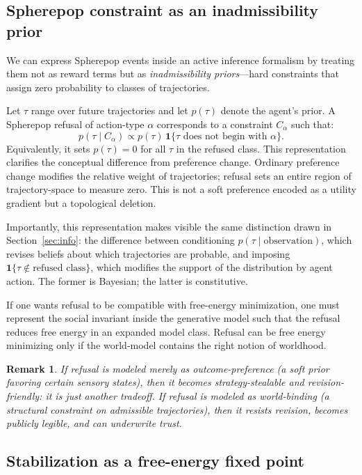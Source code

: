 \documentclass[11pt]{article}
\newtheorem{remark}{Remark}
\begin{document}
\subsection{Spherepop constraint as an inadmissibility prior}

We can express Spherepop events inside an active inference formalism by treating
them not as reward terms but as \emph{inadmissibility priors}---hard constraints
that assign zero probability to classes of trajectories.

Let $\tau$ range over future trajectories and let $p(\tau)$ denote the agent's
prior. A Spherepop refusal of action-type $\alpha$ corresponds to a constraint
$C_\alpha$ such that:
\[
p(\tau \mid C_\alpha) \propto p(\tau)\,\mathbf{1}\{\tau \text{ does not begin with }\alpha\}.
\]
Equivalently, it sets $p(\tau)=0$ for all $\tau$ in the refused class. This
representation clarifies the conceptual difference from preference change.
Ordinary preference change modifies the relative weight of trajectories; refusal
sets an entire region of trajectory-space to measure zero. This is not a soft
preference encoded as a utility gradient but a topological deletion.

Importantly, this representation makes visible the same distinction drawn in
Section~\ref{sec:info}: the difference between conditioning
$p(\tau \mid \text{observation})$, which revises beliefs about which trajectories
are probable, and imposing $\mathbf{1}\{\tau \notin \text{refused class}\}$,
which modifies the support of the distribution by agent action. The former is
Bayesian; the latter is constitutive.

If one wants refusal to be compatible with free-energy minimization, one must
represent the social invariant inside the generative model such that the refusal
reduces free energy in an expanded model class. Refusal can be free energy
minimizing only if the world-model contains the right notion of worldhood.

\begin{remark}
If refusal is modeled merely as outcome-preference (a soft prior favoring
certain sensory states), then it becomes strategy-stealable and
revision-friendly: it is just another tradeoff. If refusal is modeled as
world-binding (a structural constraint on admissible trajectories), then it
resists revision, becomes publicly legible, and can underwrite trust.
\end{remark}

\subsection{Stabilization as a free-energy fixed point}
\end{document}
